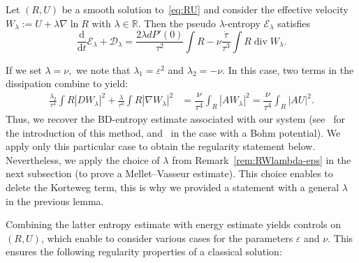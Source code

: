 \documentclass[AHL,Unicode,longabstracts]{cedram}
\DeclareMathOperator{\DIV}{div}
\newcommand*\dd {\mathrm{d}}
\newcommand*\<{\left\langle}
\renewcommand*\>{\right\rangle}
\begin{document}
\begin{lemm}\label{lem:pseudo-lambda-entropy}
Let $(R,U)$ be a smooth solution to~\eqref{eq:RU} and consider the effective velocity $W_\lambda := U + \lambda \nabla \ln R$ with $\lambda \in \mathbb R$. Then the pseudo $\lambda$-entropy $\mathcal E_{\lambda}$ satisfies
\[
\frac{\dd }{\dd t} \mathcal E_{\lambda} + \mathcal D_{\lambda} = \frac{2 \lambda d P'(0)}{\tau^2} \int R - \nu \frac{\dot \tau}{\tau^3} \int R \DIV W_\lambda.
\]
\end{lemm}

\begin{rema}
If we set $\lambda = \nu,$ we note that $\lambda_1 = \varepsilon^2$ and $\lambda_2=-\nu.$ In this case, two terms in the dissipation combine to yield:
\[
\begin{aligned}
\frac{\lambda_2}{\tau^4} \int R |D W_\lambda|^2 +
\frac{\lambda}{\tau^4} \int R |\nabla W_\lambda|^2 & = \dfrac{\nu}{\tau^4} \int_{R} |A W_{\lambda}|^2 = \dfrac{\nu}{\tau^4} \int_{R} |A U|^2.
\end{aligned}
\]
Thus, we recover the BD-entropy estimate associated with our system (see~\cite{BD04,Bre-De-CKL-03} for the introduction of this method, and~\cite{VasseurYu} in the case with a Bohm potential). We apply only this particular case to obtain the regularity statement below. Nevertheless, we apply the choice of $\lambda$ from Remark~\ref{rem:RWlambda-eps} in the next subsection (to prove a Mellet--Vasseur estimate). This choice enables to delete the Korteweg term, this is why we provided a statement with a general $\lambda$ in the previous lemma.
\end{rema}

Combining the latter entropy estimate with energy estimate yields controls on $(R,U)$, which enable to consider various cases for the parameters $\varepsilon$ and $\nu.$ This ensures the following regularity properties of a classical solution:
\end{document}
